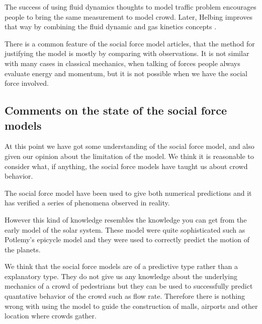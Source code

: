 The success of using fluid dynamics thoughts to model traffic problem encourages 
people to bring the same measurement to model crowd. Later, Helbing improves that 
way by combining the fluid dynamic and gas kinetics concepts \cite{social-force}. 


There is a common feature of the social force model articles, that the method for 
justifying the model is mostly by comparing with observations. It is not 
similar with many cases in classical mechanics, when talking of forces people 
always evaluate energy and momentum, but it is not possible when we have 
the social force involved.

\subsection{Comments on the state of the social force models}
At this point we have got some understanding of the social force model, and 
also given our opinion about the limitation of the model. We think it is 
reasonable to consider what, if anything, the social force models have taught 
us about crowd behavior. 

The social force model have been used to give both numerical predictions 
and it has verified a series of phenomena observed in reality.

However this kind of knowledge resembles the knowledge you can get from 
the early model of the solar system. These model were quite sophisticated 
such as Potlemy's epicycle model and they were used to correctly predict the 
motion of the planets.

We think that the social force models are of a predictive type rather than 
a explanatory type. They do not give us any knowledge about the underlying 
mechanics of a crowd of pedestrians but they can be used to successfully 
predict quantative behavior of the crowd such as  flow rate. Therefore there 
is nothing wrong with using the model to guide the construction of malls, airports 
and other location where crowds gather.